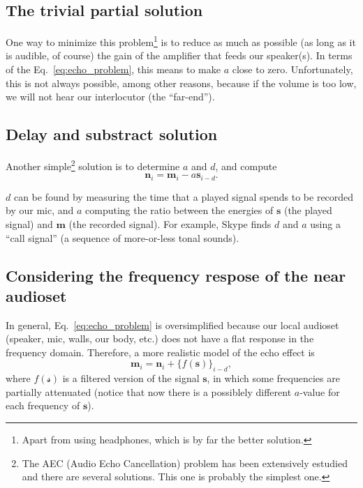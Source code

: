 \subsection{The trivial partial solution}

One way to minimize this problem\footnote{Apart from using headphones,
  which is by far the better solution.} is to reduce as much as
possible (as long as it is audible, of course) the gain of the
amplifier that feeds our speaker(s). In terms of the
Eq.~\eqref{eq:echo_problem}, this means to make $a$ close to
zero. Unfortunately, this is not always possible, among other reasons,
because if the volume is too low, we will not hear our interlocutor
(the ``far-end'').

\subsection{Delay and substract solution}

Another simple\footnote{The AEC (Audio Echo Cancellation) problem has
  been extensively estudied and there are several solutions. This one
  is probably the simplest one.} solution is to determine $a$ and $d$,
and compute
\begin{equation}
  {\mathbf n}_i = {\mathbf m}_i - a{\mathbf s}_{i-d}.
  \label{eq:echo_cancellation}
\end{equation}

$d$ can be found by measuring the time that a played signal spends to
be recorded by our mic, and $a$ computing the ratio between the
energies of ${\mathbf s}$ (the played signal) and ${\mathbf m}$ (the
recorded signal). For example, Skype finds $d$ and $a$ using a ``call
signal'' (a sequence of more-or-less tonal sounds).

\subsection{Considering the frequency respose of the near audioset}

In general, Eq.~\eqref{eq:echo_problem} is oversimplified because our
local audioset (speaker, mic, walls, our body, etc.) does not have a
flat response in the frequency domain. Therefore, a more realistic
model of the echo effect is
\begin{equation}
   {\mathbf m}_i = {\mathbf n}_i + \{f({\mathbf s})\}_{i-d},
  \label{eq:more_realistic_echo_problem}
\end{equation}
where $f({\mathcal s})$ is a filtered version of the signal
${\mathbf s}$, in which some frequencies are partially attenuated
(notice that now there is a possiblely different $a$-value for each
frequency of ${\mathbf s}$).

